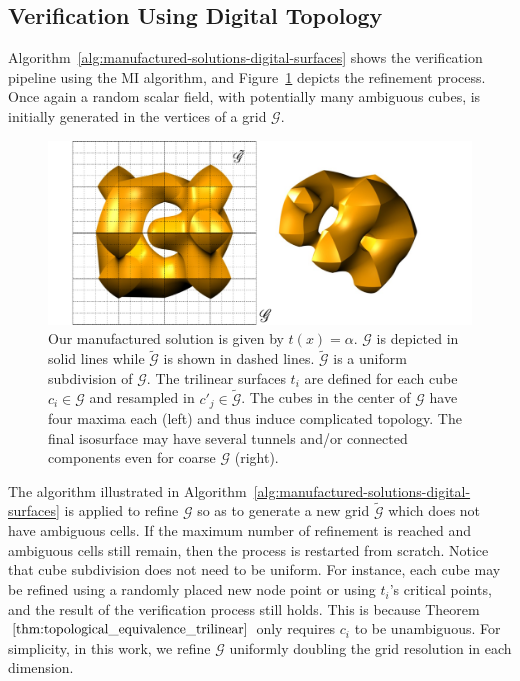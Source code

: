 \subsection{Verification Using Digital Topology}
\label{subsec:ds-verify}

Algorithm~\ref{alg:manufactured-solutions-digital-surfaces} shows the
verification pipeline using the MI algorithm, and
Figure~\ref{fig:trilinear-field} depicts the refinement process. Once
again a random scalar field, with potentially many ambiguous cubes, is
initially generated in the vertices of a grid $\mathcal{G}$.  
\begin{figure}[b]
\centering
\includegraphics[width=0.7\linewidth,keepaspectratio=true]
{chapter3/figures/trilinear-field.pdf}
\caption{\label{fig:trilinear-field}Our manufactured solution is given by $t(x) = \alpha$. $\mathcal{G}$ is
depicted in solid lines while $\tilde{\mathcal{G}}$ is shown in dashed lines.
$\tilde{\mathcal{G}}$ is a uniform subdivision of $\mathcal{G}$. The trilinear
surfaces $t_i$ are defined for each cube
$c_i \in \mathcal{G}$ and resampled in $c'_j \in \tilde{\mathcal{G}}$.
The cubes in the center of $\mathcal{G}$ have four maxima each
(left) and thus induce complicated topology. The final
isosurface may have several tunnels and/or connected
components even for coarse $\mathcal{G}$ (right). }
\end{figure}
The
algorithm illustrated in Algorithm~\ref{alg:manufactured-solutions-digital-surfaces} is applied to
refine $\mathcal{G}$ so as to generate a new grid
$\tilde{\mathcal{G}}$ which does not have ambiguous cells. If the
maximum number of refinement is reached and ambiguous cells still
remain, then the process is restarted from scratch.  Notice that cube
subdivision does not need to be uniform.  For instance, each cube may
be refined using a randomly placed new node point or using $t_i$'s
critical points, and the result of the verification process still
holds.  This is because Theorem
$\ref{thm:topological_equivalence_trilinear}$ only requires $c_i$ to
be unambiguous.
For simplicity, in this work, we refine $\mathcal{G}$ uniformly
doubling the grid resolution in each dimension.

